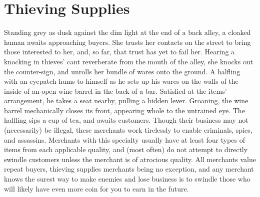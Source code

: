 \documentclass[10pt,a4paper,twoside,twocolumn,openany,nodeprecatedcode,bg=print]{dndbook}
\begin{document}
\section{Thieving Supplies}
Standing grey as dusk against the dim light at the end of a back alley, a cloaked human awaits approaching buyers. She trusts her contacts on the street to bring those interested to her, and, so far, that trust has yet to fail her. Hearing a knocking in thieves' cant reverberate from the mouth of the alley, she knocks out the counter-sign, and unrolls her bundle of wares onto the ground.
A halfling with an eyepatch hums to himself as he sets up his wares on the walls of the inside of an open wine barrel in the back of a bar. Satisfied at the items' arrangement, he takes a seat nearby, pulling a hidden lever. Groaning, the wine barrel mechanically closes its front, appearing whole to the untrained eye. The halfling sips a cup of tea, and awaits customers.
Though their business may not (necessarily) be illegal, these merchants work tirelessly to enable criminals, spies, and assassins. Merchants with this specialty usually have at least four types of items from each applicable quality, and (most often) do not attempt to directly swindle customers unless the merchant is of atrocious quality. All merchants value repeat buyers, thieving supplies merchants being no exception, and any merchant knows the surest way to make enemies and lose business is to swindle those who will likely have even more coin for you to earn in the future.
\end{document}
